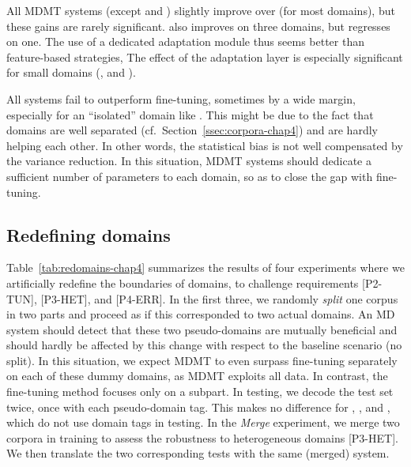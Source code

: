 All MDMT systems (except  and ) slightly improve over (for most domains), but these gains are rarely significant.    also improves on three domains, but regresses on one. The use of a dedicated adaptation module thus seems better than feature-based strategies,  The effect of the adaptation layer is especially significant for small domains (,  and ).

All systems fail to outperform fine-tuning, sometimes by a wide margin, especially for an ``isolated'' domain like . This might be due to the fact that domains are well separated (cf.\ Section~\ref{ssec:corpora-chap4}) and are hardly helping each other. In other words, the statistical bias is not well compensated by the variance reduction. In this situation, MDMT systems should dedicate a sufficient number of parameters to each domain, so as to close the gap with fine-tuning.

\subsection{Redefining domains \label{ssec:redomains-chap4}}

Table~\ref{tab:redomains-chap4} summarizes the results of four experiments where we artificially redefine the boundaries of domains, to challenge requirements [P2-TUN], [P3-HET], and [P4-ERR]. In the first three, we randomly \emph{split} one corpus in two parts and proceed as if this corresponded to two actual domains. An MD system should detect that these two pseudo-domains are mutually beneficial and should hardly be affected by this change with respect to the baseline scenario (no split). In this situation, we expect MDMT to even surpass fine-tuning separately on each of these dummy domains, as MDMT exploits all data. In contrast, the fine-tuning method focuses only on a subpart. In testing, we decode the test set twice, once with each pseudo-domain tag. This makes no difference for , ,  and , which do not use domain tags in testing. In the \textsl{Merge} experiment, we merge two corpora in training to assess the robustness to heterogeneous domains [P3-HET]. We then translate the two corresponding tests with the same (merged) system.

